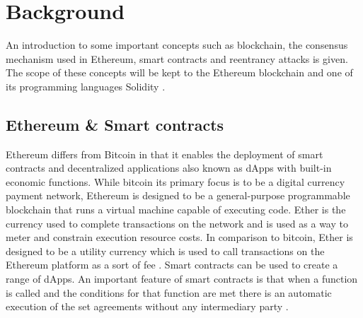 \documentclass[10pt,conference]{IEEEtran}
\begin{document}
\section{Background}
An introduction to some important concepts such as blockchain, the consensus mechanism used in Ethereum, smart contracts and reentrancy attacks is given. The scope of these concepts will be kept to the Ethereum blockchain and one of its programming languages Solidity \cite{solidity}.


\subsection{Ethereum \& Smart contracts}
Ethereum differs from Bitcoin in that it enables the deployment of smart contracts and decentralized applications also known as dApps with built-in economic functions. While bitcoin its primary focus is to be a digital currency payment network, Ethereum is designed to be a general-purpose programmable blockchain that runs a virtual machine capable of executing code.
Ether is the currency used to complete transactions on the network and is used as a way to meter and constrain execution resource costs. In comparison to bitcoin, Ether is designed to be a utility currency which is used to call transactions on the Ethereum platform as a sort of fee \cite{mastering}. %
Smart contracts can be used to create a range of dApps.  An important feature of smart contracts is that when a function is called and the conditions for that function are met there is an automatic execution of the set agreements without any intermediary party \cite{ethereum, white_paper}.

\end{document}
